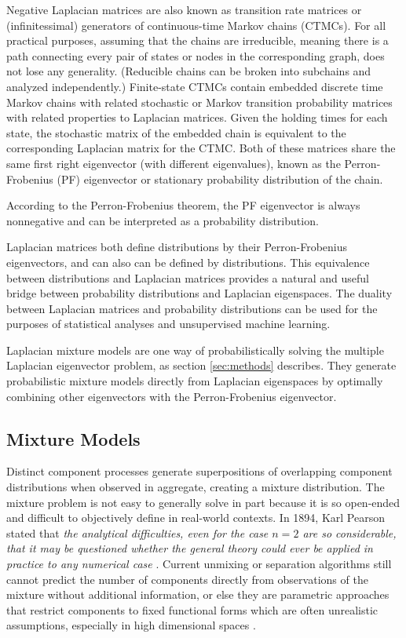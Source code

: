 \documentclass[10pt,letterpaper]{article}
\begin{document}
Negative Laplacian matrices are also known as transition rate matrices or (infinitessimal) generators of continuous-time Markov chains (CTMCs).
For all practical purposes, assuming that the chains are irreducible, meaning there is a path connecting every pair of states or nodes in the corresponding graph, does not lose any generality.
(Reducible chains can be broken into subchains and analyzed independently.)
Finite-state CTMCs contain embedded discrete time Markov chains with related stochastic or Markov transition probability matrices with related properties to Laplacian matrices.
Given the holding times for each state, the stochastic matrix of the embedded chain is equivalent to the corresponding Laplacian matrix for the CTMC.
Both of these matrices share the same first right eigenvector (with different eigenvalues), known as the Perron-Frobenius (PF) eigenvector or stationary probability distribution of the chain.

According to the Perron-Frobenius theorem, the PF eigenvector is always nonnegative and can be interpreted as a probability distribution.

Laplacian matrices both define distributions by their Perron-Frobenius eigenvectors, and can also can be defined by distributions.
This equivalence between distributions and Laplacian matrices provides a natural and useful bridge between probability distributions and Laplacian eigenspaces.
The duality between Laplacian matrices and probability distributions can be used for the purposes of statistical analyses and unsupervised machine learning.

Laplacian mixture models are one way of probabilistically solving the multiple Laplacian eigenvector problem, as section \ref{sec:methods} describes.
They generate probabilistic mixture models directly from Laplacian eigenspaces by optimally combining other eigenvectors with the Perron-Frobenius eigenvector.
\subsection{Mixture Models}
Distinct component processes generate superpositions of overlapping component distributions when observed in aggregate, creating a mixture distribution.
The mixture problem is not easy to generally solve in part because it is so open-ended and difficult to objectively define in real-world contexts.
In 1894, Karl Pearson stated that \emph{the analytical difficulties, even for the case $n=2$ are so considerable, that it may be questioned whether the general theory could ever be applied in practice to any numerical case} \cite{pearson}.
Current unmixing or separation algorithms still cannot predict the number of components directly from observations of the mixture without additional information, or else they are parametric approaches that restrict components to fixed functional forms which are often unrealistic assumptions, especially in high dimensional spaces \cite{jordan06}.
\end{document}
